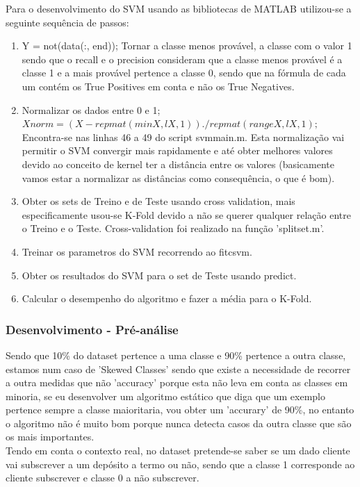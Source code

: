\documentclass[portugues,final]{revdetua}
\begin{document}
Para o desenvolvimento do SVM usando as bibliotecas de MATLAB utilizou-se a seguinte sequência de passos:
\begin{enumerate}
\item Y = not(data(:, end)); Tornar a classe menos provável, a classe com o valor 1 sendo que o recall e o precision consideram que a classe menos provável é a classe 1 e a mais provável pertence a classe 0, sendo que na fórmula de cada um contém os True Positives em conta e não os True Negatives.
\item Normalizar os dados entre 0 e 1; $Xnorm = (X - repmat(minX, lX, 1)) ./ repmat(rangeX, lX, 1); $\\Encontra-se nas linhas 46 a 49 do script svmmain.m. Esta normalização vai permitir o SVM convergir mais rapidamente e até obter melhores valores devido ao conceito de kernel ter a distância entre os valores (basicamente vamos estar a normalizar as distâncias como consequência, o que é bom).
\item Obter os sets de Treino e de Teste usando cross validation, mais especificamente usou-se K-Fold devido a não se querer qualquer relação entre o Treino e o Teste. Cross-validation foi realizado na função 'splitset.m'.
\item Treinar os parametros do SVM recorrendo ao fitcsvm.
\item Obter os resultados do SVM para o set de Teste usando predict.
\item Calcular o desempenho do algoritmo e fazer a média para o K-Fold.
\end{enumerate}

\subsubsection{Desenvolvimento - Pré-análise}

Sendo que 10\% do dataset pertence a uma classe e 90\% pertence a outra classe, estamos num caso de 'Skewed Classes' sendo que existe a necessidade de recorrer a outra medidas que não 'accuracy' porque esta não leva em conta as classes em minoria, se eu desenvolver um algoritmo estático que diga que um exemplo pertence sempre a classe maioritaria, vou obter um 'accurary' de 90\%, no entanto o algoritmo não é muito bom porque nunca detecta casos da outra classe que são os mais importantes.\\

Tendo em conta o contexto real, no dataset pretende-se saber se um dado cliente vai subscrever a um depósito a termo ou não, sendo que a classe 1 corresponde ao cliente subscrever e classe 0 a não subscrever.\\
\end{document}
